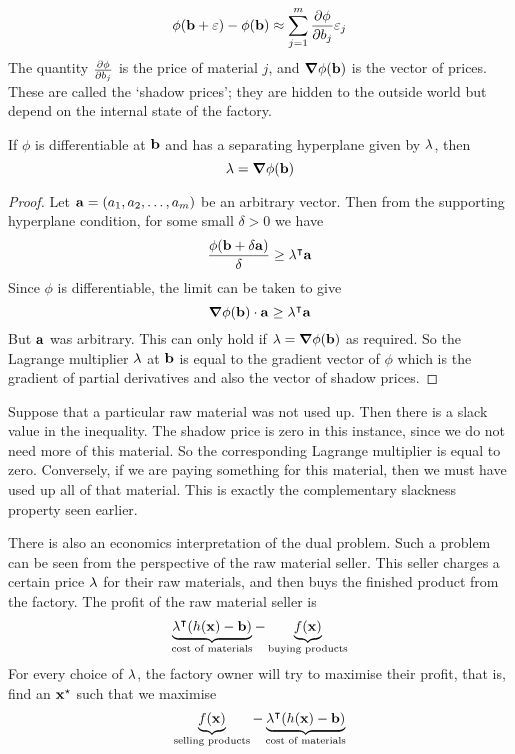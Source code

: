 \[
	\phi(\vb b + \vb\varepsilon) - \phi(\vb b) \approx \sum_{j=1}^m \pdv{\phi}{b_j}(\vb b) \varepsilon_j
\]
The quantity \( \pdv{\phi}{b_j}(\vb b) \) is the price of material \( j \), and \( \grad \phi(\vb b) \) is the vector of prices.
These are called the `shadow prices'; they are hidden to the outside world but depend on the internal state of the factory.

\begin{theorem}
	If \( \phi \) is differentiable at \( \vb b \) and has a separating hyperplane given by \( \vb \lambda \), then
	\[
		\vb \lambda = \grad{\phi}(\vb b)
	\]
\end{theorem}
\begin{proof}
	Let \( \vb a = (a_1, a_2, \dots, a_m) \) be an arbitrary vector.
	Then from the supporting hyperplane condition, for some small \( \delta > 0 \) we have
	\[
		\frac{\phi(\vb b + \delta\vb a)}{\delta} \geq \vb \lambda^\intercal \vb a
	\]
	Since \( \phi \) is differentiable, the limit can be taken to give
	\[
		\grad{\phi}(\vb b) \cdot \vb a \geq \vb \lambda^\intercal \vb a
	\]
	But \( \vb a \) was arbitrary.
	This can only hold if \( \vb \lambda = \grad{\phi}(\vb b) \) as required.
	So the Lagrange multiplier \( \vb \lambda \) at \( \vb b \) is equal to the gradient vector of \( \phi \) which is the gradient of partial derivatives and also the vector of shadow prices.
\end{proof}

\noindent Suppose that a particular raw material was not used up.
Then there is a slack value in the inequality.
The shadow price is zero in this instance, since we do not need more of this material.
So the corresponding Lagrange multiplier is equal to zero.
Conversely, if we are paying something for this material, then we must have used up all of that material.
This is exactly the complementary slackness property seen earlier.

There is also an economics interpretation of the dual problem.
Such a problem can be seen from the perspective of the raw material seller.
This seller charges a certain price \( \vb \lambda \) for their raw materials, and then buys the finished product from the factory.
The profit of the raw material seller is
\[
	\underbrace{\vb\lambda^\intercal (h(\vb x) - \vb b)}_{\text{cost of materials}} - \underbrace{f(\vb x)}_{\text{buying products}}
\]
For every choice of \( \vb\lambda \), the factory owner will try to maximise their profit, that is, find an \( \vb x^\star \) such that we maximise
\[
	\underbrace{f(\vb x)}_{\text{selling products}} - \underbrace{\vb\lambda^\intercal (h(\vb x) - \vb b)}_{\text{cost of materials}}
\]
